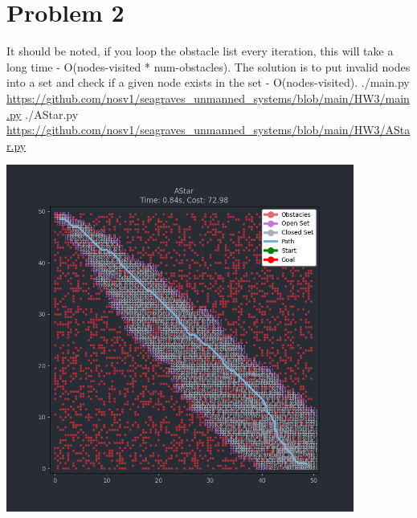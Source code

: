 \documentclass{article}
\begin{document}
        \section*{Problem 2}
            \begin{minipage}{\linewidth}
                \raggedright
                It should be noted, if you loop the obstacle list every iteration, this will take a long time - O(nodes-visited * num-obstacles). The solution is to put invalid nodes into a set and check if a given node exists in the set - O(nodes-visited). \break 
                \break
                ./main.py \break
                \url{https://github.com/nosv1/seagraves_unmanned_systems/blob/main/HW3/main.py} \break
                ./AStar.py \break
                \url{https://github.com/nosv1/seagraves_unmanned_systems/blob/main/HW3/AStar.py}
                \begin{center}
                    \includegraphics[height=4.5in]{HW3P2 AStar.png}
                \end{center}
            \end{minipage}
\end{document}
